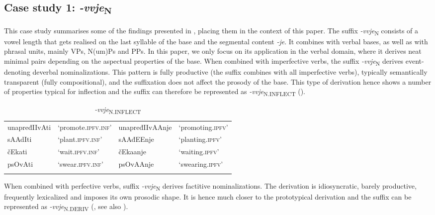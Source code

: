 \documentclass[output=paper]{langsci/langscibook}
\begin{document}
\subsection{Case study 1: \textit{-vvje}\textsubscript{N}}\label{sec:simonovic:41}

This case study summarises some of the findings presented in \citet{Sim2014}, placing them in the context of this paper. The suffix \textit{-vvje}\textsubscript{N} consists of a vowel length that gets realised on the last syllable of the base and the segmental content \textit{-je}. It combines with verbal bases, as well as with phrasal units, mainly VPs, N(um)Ps and PPs. In this paper, we only focus on its application in the verbal domain, where it derives neat minimal pairs depending on the aspectual properties of the base.
When combined with imperfective verbs, the suffix \textit{-vvje}\textsubscript{N} derives event-denoting deverbal nominalizations. This pattern is fully productive (the suffix combines with all imperfective verbs), typically semantically transparent (fully compositional), and the suffixation does not affect the prosody of the base. This type of derivation hence shows a number of properties typical for inflection and the suffix can therefore be represented as \textit{-vvje}\textsubscript{N.INFLECT} ().

\begin{table}
\caption{\textit{-vvje}\textsubscript{N.INFLECT}}
\label{tab3}
 \begin{tabular}{l l|l l}
\lsptoprule
unapređIIvAti & `promote.\textsc{ipfv.inf}' & unapređIIvAAnje & `promoting.\textsc{ipfv}' \\
sAAdIti & `plant.\textsc{ipfv.inf}' & sAAđEEnje & `planting.\textsc{ipfv}' \\ 
čEkati & `wait.\textsc{ipfv.inf}' & čEkaanje   &`waiting.\textsc{ipfv}' \\  psOvAti &  `swear.\textsc{ipfv.inf}' & psOvAAnje & `swearing.\textsc{ipfv}' \\ 
 \lspbottomrule
 \end{tabular}
\end{table}

When combined with perfective verbs, suffix \textit{-vvje}\textsubscript{N} derives factitive nominalizations. The derivation is idiosyncratic, barely productive, frequently lexicalized and imposes its own prosodic shape. It is hence much closer to the prototypical derivation and the suffix can be represented as \textit{-vvje}\textsubscript{N.DERIV} (, see also \citealt{Sim2018}).
\end{document}
